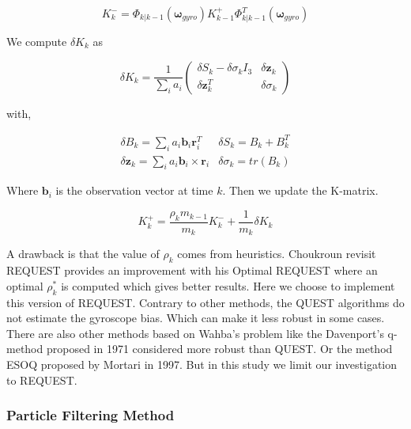 \documentclass[conference]{IEEEtran}
\begin{document}
\begin{equation}
K_k^- = \Phi_{k|k-1}(\boldsymbol\omega_{gyro})K_{k-1}^+\Phi_{k|k-1}^T(\boldsymbol\omega_{gyro})
\end{equation}

We compute $\delta K_k $ as

\begin{equation}
\delta K_k = \frac{1}{\sum_ia_i}\begin{pmatrix} \delta S_k-\delta\sigma_kI_3 & \delta\textbf{z}_k \\ \delta\textbf{z}_k^T & \delta\sigma_k
\end{pmatrix}
\end{equation}

with,

\begin{equation}
\begin{array}{cc}
\delta B_k = \sum_i a_i \textbf{b}_i\textbf{r}_i^T & \delta S_k = B_k + B_k^T\\
\delta \textbf{z}_k = \sum_ia_i\textbf{b}_i\times\textbf{r}_i & \delta \sigma_k = tr(B_k)
\end{array}
\end{equation}

Where $\textbf{b}_i$ is the observation vector at time $k$. Then we update the K-matrix.

\begin{equation}
K_k^+ = \frac{\rho_k m_{k-1}}{m_k}K_k^- + \frac{1}{m_k}\delta K_k
\end{equation}


A drawback is that the value of $\rho_k$ comes from heuristics. Choukroun revisit REQUEST provides an improvement with his Optimal REQUEST \cite{choukroun_novel_2003} where an optimal $\rho_k^*$ is computed which gives better results. Here we choose to implement this version of REQUEST. Contrary to other methods, the QUEST algorithms do not estimate the gyroscope bias. Which can make it less robust in some cases.
There are also other methods based on Wahba's problem like the Davenport's q-method \cite{weighted1971nasa} proposed in 1971 considered more robust than QUEST. Or the method ESOQ proposed by Mortari \cite{mortari1997esoq}  in 1997. But in this study we limit our investigation to REQUEST.\\



\subsubsection{Particle Filtering Method}
\end{document}
